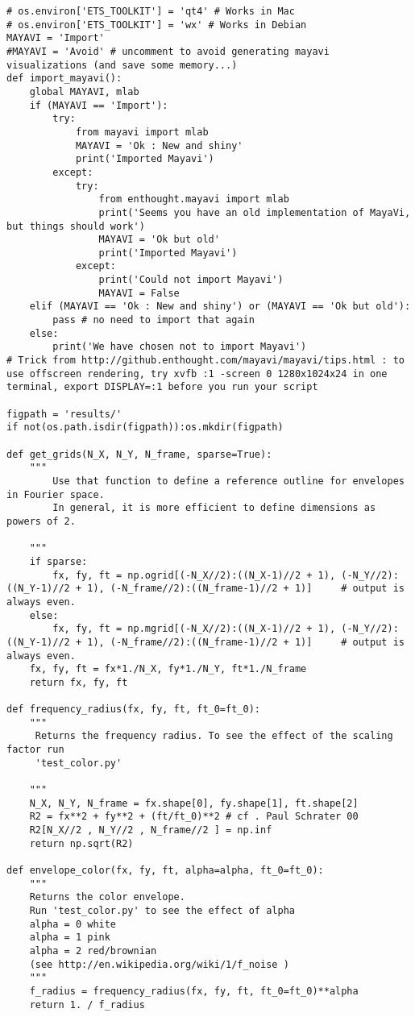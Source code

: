 \documentclass[a4paper,11pt]{article}%
\begin{document}
\begin{lstlisting}
# os.environ['ETS_TOOLKIT'] = 'qt4' # Works in Mac
# os.environ['ETS_TOOLKIT'] = 'wx' # Works in Debian
MAYAVI = 'Import'
#MAYAVI = 'Avoid' # uncomment to avoid generating mayavi visualizations (and save some memory...)
def import_mayavi():
    global MAYAVI, mlab
    if (MAYAVI == 'Import'):
        try:
            from mayavi import mlab
            MAYAVI = 'Ok : New and shiny'
            print('Imported Mayavi')
        except:
            try:
                from enthought.mayavi import mlab
                print('Seems you have an old implementation of MayaVi, but things should work')
                MAYAVI = 'Ok but old'
                print('Imported Mayavi')
            except:
                print('Could not import Mayavi')
                MAYAVI = False
    elif (MAYAVI == 'Ok : New and shiny') or (MAYAVI == 'Ok but old'):
        pass # no need to import that again
    else:
        print('We have chosen not to import Mayavi')
# Trick from http://github.enthought.com/mayavi/mayavi/tips.html : to use offscreen rendering, try xvfb :1 -screen 0 1280x1024x24 in one terminal, export DISPLAY=:1 before you run your script

figpath = 'results/'
if not(os.path.isdir(figpath)):os.mkdir(figpath)

def get_grids(N_X, N_Y, N_frame, sparse=True):
    """
        Use that function to define a reference outline for envelopes in Fourier space.
        In general, it is more efficient to define dimensions as powers of 2.

    """
    if sparse:
        fx, fy, ft = np.ogrid[(-N_X//2):((N_X-1)//2 + 1), (-N_Y//2):((N_Y-1)//2 + 1), (-N_frame//2):((N_frame-1)//2 + 1)]     # output is always even.
    else:
        fx, fy, ft = np.mgrid[(-N_X//2):((N_X-1)//2 + 1), (-N_Y//2):((N_Y-1)//2 + 1), (-N_frame//2):((N_frame-1)//2 + 1)]     # output is always even.
    fx, fy, ft = fx*1./N_X, fy*1./N_Y, ft*1./N_frame
    return fx, fy, ft

def frequency_radius(fx, fy, ft, ft_0=ft_0):
    """
     Returns the frequency radius. To see the effect of the scaling factor run
     'test_color.py'

    """
    N_X, N_Y, N_frame = fx.shape[0], fy.shape[1], ft.shape[2]
    R2 = fx**2 + fy**2 + (ft/ft_0)**2 # cf . Paul Schrater 00
    R2[N_X//2 , N_Y//2 , N_frame//2 ] = np.inf
    return np.sqrt(R2)

def envelope_color(fx, fy, ft, alpha=alpha, ft_0=ft_0):
    """
    Returns the color envelope. 
    Run 'test_color.py' to see the effect of alpha
    alpha = 0 white
    alpha = 1 pink
    alpha = 2 red/brownian
    (see http://en.wikipedia.org/wiki/1/f_noise )
    """
    f_radius = frequency_radius(fx, fy, ft, ft_0=ft_0)**alpha
    return 1. / f_radius


\end{lstlisting}
\end{document}
